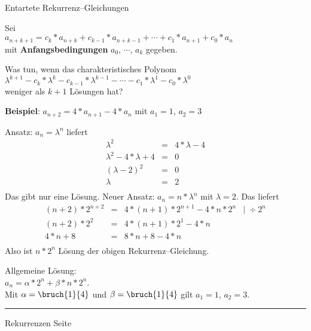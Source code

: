 
\begin{slide}{}
\normalsize

\begin{center}
Entartete Rekurrenz--Gleichungen
\end{center}
\vspace*{0.5cm}

\footnotesize
Sei \\[0.3cm]
\hspace*{0.3cm} $a_{n+k+1} = c_k * a_{n+k} + c_{k-1} * a_{n+k-1} + \cdots + c_1 * a_{n+1} + c_0 * a_{n}$ \\[0.3cm]
mit \textbf{Anfangsbedingungen} $a_0$, $\cdots$, $a_k$ gegeben.

Was tun, wenn das charakteristisches Polynom \\[0.3cm]
\hspace*{1.3cm}  $\lambda^{k+1} - c_k * \lambda^{k} - c_{k-1} * \lambda^{k-1} - \cdots - c_1 * \lambda^{1} - c_0 * \lambda^{0}$ \\[0.3cm]
weniger als $k+1$ L\"osungen hat?

\textbf{Beispiel}: $a_{n+2} = 4 * a_{n+1} - 4 * a_n$ mit $a_1 = 1$, $a_2 = 3$

Ansatz: $a_n = \lambda^n$ liefert \\[0.3cm]
 $$  
 \begin{array}{lcl}
  \lambda^2 & = & 4 * \lambda - 4    \\
  \lambda^2 - 4 * \lambda + 4& = & 0 \\
  (\lambda  - 2)^2 & = & 0 \\
  \lambda  & = & 2 \\
 \end{array}
$$
Das gibt nur eine L\"osung.  Neuer Ansatz: $a_n = n * \lambda^n$ mit $\lambda = 2$.
Das liefert
$$
\begin{array}{lcll}
  (n+2) * 2^{n+2} & = & 4 * (n+1) * 2^{n+1} - 4 * n * 2^n & \mid\; \div 2^n \\
  (n+2) * 2^{2} & = & 4 * (n+1) * 2^{1} - 4 * n  &  \\
  4 * n + 8 & = & 8 * n + 8 - 4 * n  &  \\
\end{array}
$$
Also ist $n*2^n$ L\"osung der obigen Rekurrenz--Gleichung.

Allgemeine L\"osung:\\[0.3cm]
\hspace*{1.3cm}  $a_n = \alpha * 2^n + \beta * n * 2^n$. \\[0.3cm]
Mit $\alpha = \bruch{1}{4}$ und $\beta = \bruch{1}{4}$ gilt  $a_1 = 1$, $a_2 = 3$.

\vspace*{\fill}
\tiny \addtocounter{mypage}{1}
\rule{17cm}{1mm}
Rekurrenzen  \hspace*{\fill} Seite 
\end{slide}

